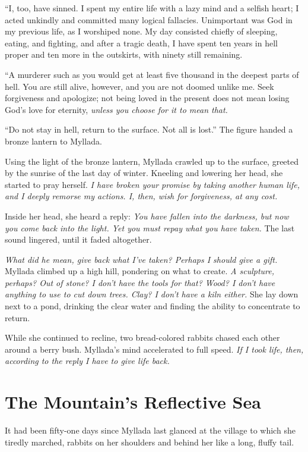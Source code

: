 ``I, too, have sinned. I spent my entire life with a lazy mind and a selfish heart; I acted unkindly and committed many logical fallacies. Unimportant was God in my previous life, as I worshiped none. My day consisted chiefly of sleeping, eating, and fighting, and after a tragic death, I have spent ten years in hell proper and ten more in the outskirts, with ninety still remaining.

``A murderer such as you would get at least five thousand in the deepest parts of hell. You are still alive, however, and you are not doomed unlike me. Seek forgiveness and apologize; not being loved in the present does not mean losing God's love for eternity, \emph{unless you choose for it to mean that.}

``Do not stay in hell, return to the surface. Not all is lost.'' The figure handed a bronze lantern to Myllada.

\centeredstars

Using the light of the bronze lantern, Myllada crawled up to the surface, greeted by the sunrise of the last day of winter. Kneeling and lowering her head, she started to pray herself. \emph{I have broken your promise by taking another human life, and I deeply remorse my actions. I, then, wish for forgiveness, at any cost.}

Inside her head, she heard a reply: \emph{You have fallen into the darkness, but now you come back into the light. Yet you must repay what you have taken.} The last sound lingered, until it faded altogether.

\emph{What did he mean, give back what I've taken? Perhaps I should give a gift.} Myllada climbed up a high hill, pondering on what to create. \emph{A sculpture, perhaps? Out of stone? I don't have the tools for that? Wood? I don't have anything to use to cut down trees. Clay? I don't have a kiln either.} She lay down next to a pond, drinking the clear water and finding the ability to concentrate to return.

While she continued to recline, two bread-colored rabbits chased each other around a berry bush. Myllada's mind accelerated to full speed. \emph{If I took life, then, according to the reply I have to give life back.}

\chapter{The Mountain's Reflective Sea}

It had been fifty-one days since Myllada last glanced at the village to which she tiredly marched, rabbits on her shoulders and behind her like a long, fluffy tail.

